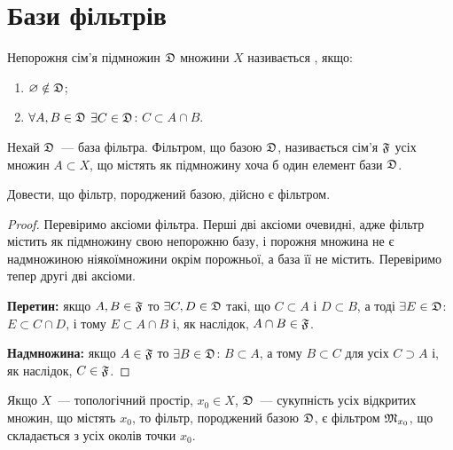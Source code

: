 \section{Бази фільтрів}

\begin{definition}
    Непорожня сім'я підмножин $\frak D$ множини $X$ називається , якщо:
    \begin{enumerate}
        \item $\emptyset \notin \frak D$;
        \item $\forall A, B \in \frak D$ $\exists C \in \frak D$: $C \subset A \cap B$.
    \end{enumerate}
\end{definition}

\begin{definition}
    Нехай $\frak D$~--- база фільтра. Фільтром, що  базою $\frak D$, називається сім'я $\frak F$ усіх множин $A \subset X$, що містять як підмножину хоча б один елемент бази $\frak D$.
\end{definition}

\begin{exercise}
    Довести, що фільтр, породжений базою, дійсно є фільтром.
\end{exercise}
\begin{proof}
    Перевіримо аксіоми фільтра. Перші дві аксіоми очевидні, адже фільтр містить як підмножину свою непорожню базу, і порожня множина не є надмножиною ніякоїмножини окрім порожньої, а база її не містить. Перевіримо тепер другі дві аксіоми. 
    
    \textbf{Перетин:} якщо $A, B \in \frak F$ то $\exists C, D \in \frak D$ такі, що $C \subset A$ і $D \subset B$, а тоді $\exists E \in \frak D$: $E \subset C \cap D$, і тому $E \subset A \cap B$ і, як наслідок, $A \cap B \in \frak F$. 
    
    \textbf{Надмножина:} якщо $A \in \frak F$ то $\exists B \in \frak D$: $B \subset A$, а тому $B 
    \subset C$ для усіх $C \supset A$ і, як наслідок, $C \in \frak F$.
\end{proof}

\begin{example}
    Якщо $X$~--- топологічний простір, $x_0 \in X$, $\frak D$~--- сукупність усіх відкритих множин, що містять $x_0$, то фільтр, породжений базою $\frak D$, є фільтром $\frak M_{x_0}$, що складається з усіх околів точки $x_0$.
\end{example}

